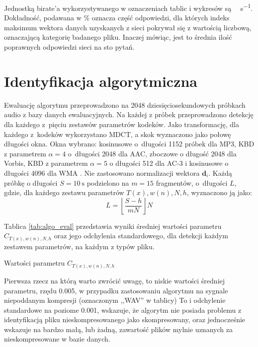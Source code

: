\documentclass[pl,12pt]{aghdpl}
\let\Oldsection\section%
\renewcommand{\section}{\FloatBarrier\Oldsection}
\begin{document}
Jednostką birate'a wykorzystywanego w oznaczeniach tablic i wykresów są
\si{\kibi\bit\per\second}. Dokładność, podawana w \si{\percent} oznacza część
odpowiedzi, dla których indeks maksimum wektora danych uzyskanych z sieci
pokrywał się z wartością liczbową, oznaczającą kategorię badanego pliku. Inaczej
mówiąc, jest to średnia ilość poprawnych odpowiedzi sieci na sto pytań.


\section{Identyfikacja algorytmiczna}
Ewaluację algorytmu przeprowadzono na 2048 dziesięciosekundowych próbkach audio
z bazy danych ewaluacyjnych. Na każdej z próbek przeprowadzono detekcję dla
każdego z~pięciu zestawów parametrów kodeków. Jako transformację, dla każdego
z~kodeków wykorzystano MDCT, a skok wyznaczono jako połowę długości okna. Okna
wybrano: kosinusowe o~długości 1152 próbek dla MP3, KBD z parametrem $\alpha =
4$ o~długości 2048 dla AAC, zboczowe o długość 2048 dla Vorbis, KBD z
parametrem $\alpha = 5$ o długości 512 dla AC-3 i kosinusowe o długości 4096
dla WMA \cite{KimRafii2018}. Nie zastosowano normalizacji wektora $\bm d_i$. Każdą próbkę o
długości $S = \SI{10}{\second}$ podzielono na $m = 15$ fragmentów, o~długości
$L$, gdzie, dla każdego zestawu parametrów $T(x),w(n),N,h$, wyznaczono ją jako:
\begin{equation}
  L = \left\lfloor\frac{S-h}{mN}\right\rfloor N
\end{equation}


Tablica \ref{tab:algo_eval} przedstawia wyniki średniej wartości parametru
$C_{T(x),w(n),N,h}$ oraz jego odchylenia standardowego, dla detekcji każdym
zestawem parametrów, na każdym z typów pliku.

\begin{table}[!tbh]
  \centering
  \caption{Wartości parametru $C_{T(x),w(n),N,h}$}
  
  \label{tab:algo_eval}
\end{table}

Pierwsza rzecz na którą warto zwrócić uwagę, to niskie wartości średniej
parametru, rzędu \num{0.005}, w przypadku zastosowaniu algorytmu na sygnale
niepoddanym kompresji (oznaczonym ,,WAV'' w tablicy) To i odchylenie standardowe
na poziome \num{0.001}, wskazuje, że algorytm nie posiada problemu z
identyfikacją pliku nieskompresowanego jako skompresowany, oraz jednocześnie
wskazuje na bardzo małą, lub żadną, zawartość plików mylnie uznanych za
nieskompresowane w bazie danych. 
\end{document}
